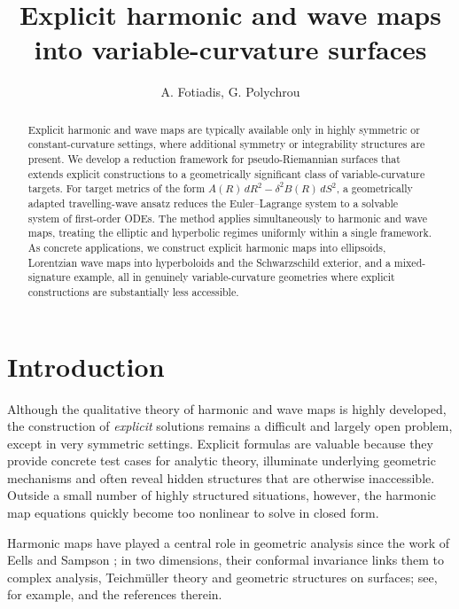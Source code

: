 \documentclass[12pt]{amsart}
\title[Explicit harmonic and wave maps into variable-curvature surfaces]%
      {Explicit harmonic and wave maps into variable-curvature surfaces}
\author{A. Fotiadis, G. Polychrou}
\begin{document}

\begin{abstract}
Explicit harmonic and wave maps are typically available only in
highly symmetric or constant-curvature settings, where additional
symmetry or integrability structures are present. We develop a
reduction framework for pseudo-Riemannian surfaces that extends
explicit constructions to a geometrically significant class of
variable-curvature targets. For target metrics of the form $A(R)\,dR^2 - \delta^2 B(R)\,dS^2$, a
geometrically adapted travelling-wave ansatz reduces the
Euler--Lagrange system to a solvable system of first-order ODEs. The method applies simultaneously to harmonic and wave maps, treating the elliptic and hyperbolic regimes uniformly within a single framework. As concrete applications, we construct explicit harmonic maps into ellipsoids, Lorentzian wave maps into hyperboloids and the Schwarzschild exterior, and a mixed-signature example, all in genuinely variable-curvature geometries where explicit constructions are substantially less accessible.
\end{abstract}

\maketitle

\section{Introduction}

Although the qualitative theory of harmonic and wave maps is highly
developed, the construction of \emph{explicit} solutions remains a
difficult and largely open problem, except in very symmetric settings.
Explicit formulas are valuable because they provide concrete test
cases for analytic theory, illuminate underlying geometric mechanisms
and often reveal hidden structures that are otherwise inaccessible.
Outside a small number of highly structured situations, however, the
harmonic map equations quickly become too nonlinear to solve in closed
form.

Harmonic maps have played a central role in geometric analysis since
the work of Eells and Sampson \cite{EellsSampson,EellsLemaire}; in two dimensions,
their conformal invariance links them to complex analysis,
Teichm\"{u}ller theory and geometric structures on surfaces; see,
for example, \cite{Helein, M1, M2, Minsky, S-Y, Wolf1, Wolf2, Wolf3}
and the references therein.
\end{document}
